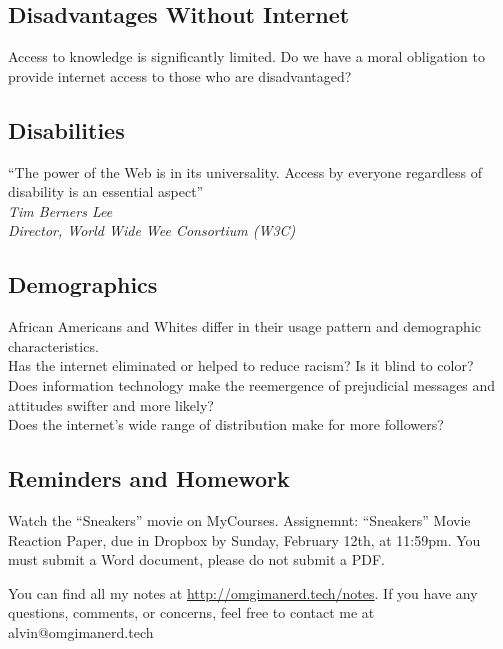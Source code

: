 \documentclass[letterpaper, 12pt]{article}
\begin{document}
\subsection*{Disadvantages Without Internet}
Access to knowledge is significantly limited.
Do we have a moral obligation to provide internet access to those who are
disadvantaged?

\subsection*{Disabilities}
``The power of the Web is in its universality. Access by everyone regardless of
disability is an essential aspect'' \\
\textit{Tim Berners Lee} \\
\textit{Director, World Wide Wee Consortium (W3C)}

\subsection*{Demographics}
African Americans and Whites differ in their usage pattern and demographic
characteristics. \\
Has the internet eliminated or helped to reduce racism? Is it blind to color? \\
Does information technology make the reemergence of prejudicial messages and
attitudes swifter and more likely? \\
Does the internet's wide range of distribution make for more followers?

\subsection*{Reminders and Homework}
Watch the ``Sneakers'' movie on MyCourses.
Assignemnt: ``Sneakers'' Movie Reaction Paper, due in Dropbox by Sunday,
February 12th, at 11:59pm. You must submit a Word document, please do not
submit a PDF.

\begin{center}
  You can find all my notes at \url{http://omgimanerd.tech/notes}. If you have
  any questions, comments, or concerns, feel free to contact me at
  alvin@omgimanerd.tech
\end{center}
\end{document}
